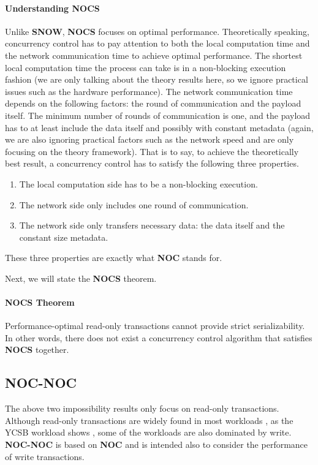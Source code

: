 \paragraph{Understanding NOCS}
Unlike \textbf{SNOW}, \textbf{NOCS} focuses on optimal performance. Theoretically speaking, concurrency control has to pay attention to both the local computation time and the network communication time to achieve optimal performance. The shortest local computation time the process can take is in a non-blocking execution fashion (we are only talking about the theory results here, so we ignore practical issues such as the hardware performance). The network communication time depends on the following factors: the round of communication and the payload itself. The minimum number of rounds of communication is one, and the payload has to at least include the data itself and possibly with constant metadata (again, we are also ignoring practical factors such as the network speed and are only focusing on the theory framework). That is to say, to achieve the theoretically best result, a concurrency control has to satisfy the following three properties.

\begin{enumerate}
    \item The local computation side has to be a non-blocking execution.
    \item The network side only includes one round of communication.
    \item The network side only transfers necessary data: the data itself and the constant size metadata. 
\end{enumerate}

These three properties are exactly what \textbf{NOC} stands for.


Next, we will state the \textbf{NOCS} theorem.

\paragraph{NOCS Theorem} Performance-optimal read-only transactions cannot provide strict serializability. In other words, there does not exist a concurrency control algorithm that satisfies \textbf{NOCS} together.




\subsection{NOC-NOC}

The above two impossibility results only focus on read-only transactions. Although read-only transactions are widely found in most workloads \cite{cooper2010benchmarking}, as the YCSB workload shows \cite{cooper2010benchmarking}, some of the workloads are also dominated by write.  \textbf{NOC-NOC} is based on \textbf{NOC} and is intended also to consider the performance of write transactions.


